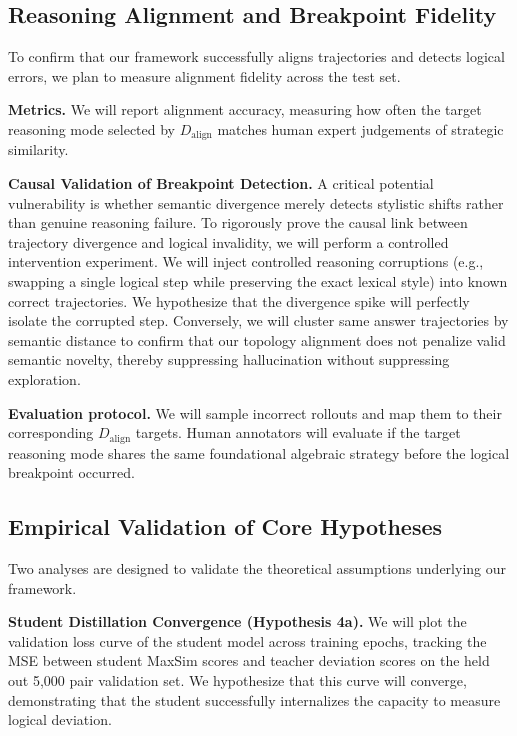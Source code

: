 \documentclass[conference]{IEEEtran}
\begin{document}
\subsection{Reasoning Alignment and Breakpoint Fidelity}

To confirm that our framework successfully aligns trajectories and detects logical errors, we plan to measure alignment fidelity across the test set.

\textbf{Metrics.} We will report alignment accuracy, measuring how often the target reasoning mode selected by $D_{\mathrm{align}}$ matches human expert judgements of strategic similarity.

\textbf{Causal Validation of Breakpoint Detection.} A critical potential vulnerability is whether semantic divergence merely detects stylistic shifts rather than genuine reasoning failure. To rigorously prove the causal link between trajectory divergence and logical invalidity, we will perform a controlled intervention experiment. We will inject controlled reasoning corruptions (e.g., swapping a single logical step while preserving the exact lexical style) into known correct trajectories. We hypothesize that the divergence spike will perfectly isolate the corrupted step. Conversely, we will cluster same answer trajectories by semantic distance to confirm that our topology alignment does not penalize valid semantic novelty, thereby suppressing hallucination without suppressing exploration.

\textbf{Evaluation protocol.} We will sample incorrect rollouts and map them to their corresponding $D_{\mathrm{align}}$ targets. Human annotators will evaluate if the target reasoning mode shares the same foundational algebraic strategy before the logical breakpoint occurred.

\subsection{Empirical Validation of Core Hypotheses}

Two analyses are designed to validate the theoretical assumptions underlying our framework.

\textbf{Student Distillation Convergence (Hypothesis 4a).} We will plot the validation loss curve of the student model across training epochs, tracking the MSE between student MaxSim scores and teacher deviation scores on the held out 5,000 pair validation set. We hypothesize that this curve will converge, demonstrating that the student successfully internalizes the capacity to measure logical deviation.
\end{document}
